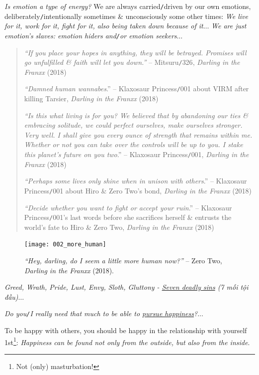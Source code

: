 \documentclass[12pt,twoside]{book}
\begin{document}
{\it Is emotion a type of energy?} We are always carried{\tt/}driven by our own emotions, deliberately{\tt/}intentionally sometimes \& unconsciously some other times: {\it We live for it, work for it, fight for it, also being taken down because of it}$\ldots$ {\it We are just emotion's slaves: emotion hiders and{\tt/}or emotion seekers}$\ldots$
\begin{quotation}
	{\it``If you place your hopes in anything, they will be betrayed. Promises will go unfulfilled \& faith will let you down.''} -- {\sf Mitsuru{\tt/}326}, {\it{\sc Darling} in the {\sc Franxx}} (2018)
	
	{\it``Damned human wannabes}.'' -- Klaxosaur Princess{\tt/}001 about VIRM after killing Tarsier, {\it {\sc Darling} in the {\sc Franxx}} (2018)
	
	{\it``Is this what living is for you? We believed that by abandoning our ties \& embracing solitude, we could perfect ourselves, make ourselves stronger. Very well. I shall give you every ounce of strength that remains within me. Whether or not you can take over the controls will be up to you. I stake this planet's future on you two}.'' -- Klaxosaur Princess{\tt/}001, {\it {\sc Darling} in the {\sc Franxx}} (2018)
	
	{\it``Perhaps some lives only shine when in unison with others}.'' -- Klaxosaur Princess{\tt/}001 about Hiro \& Zero Two's bond, {\it {\sc Darling} in the {\sc Franxx}} (2018)
	
	{\it``Decide whether you want to fight or accept your ruin}.'' -- Klaxosaur Princess{\tt/}001's last words before she sacrifices herself \& entrusts the world's fate to Hiro \& Zero Two, {\it {\sc Darling} in the {\sc Franxx}} (2018)
\end{quotation}

\begin{figure}[H]
	\centering
	\texttt{[image: 002\_more\_human]}
	\caption{{\it``Hey, darling, do I seem a little more human now?''} -- Zero Two, {\it {\sc Darling} in the {\sc Franxx}} (2018).}
	\label{fig5}
\end{figure}
{\it Greed, Wrath, Pride, Lust, Envy, Sloth, Gluttony - \href{https://en.wikipedia.org/wiki/Seven_deadly_sins}{Seven deadly sins} (7 mối tội đầu)}$\ldots$

{\it Do you{\tt/}I really need that much to be able to \href{https://www.imdb.com/title/tt0454921/}{pursue happiness}?}$\ldots$

To be happy with others, you should be happy in the relationship with yourself 1st\footnote{Not (only) masturbation!}: {\it Happiness can be found not only from the outside, but also from the inside}.
\end{document}

